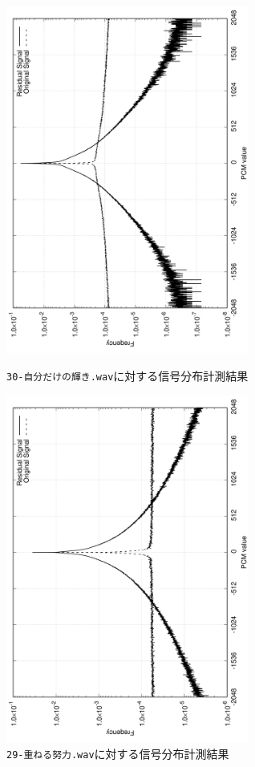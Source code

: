 \documentclass[uplatex,dvipdfmx,b5j,10pt]{jsbook}
\theoremstyle{definition}
\begin{document}
\begin{figure}[htbp]
  \begin{center}
    \includegraphics[width=80mm,angle=-90]{./figs/jibundakenokagayaki_dist.png}
    \caption{\texttt{30-自分だけの輝き.wav}に対する信号分布計測結果} \label{jibundakenokagayaki_dist}
  \end{center}
  \begin{center}
    \includegraphics[width=80mm,angle=-90]{./figs/kasanerudoryoku_dist.png}
    \caption{\texttt{29-重ねる努力.wav}に対する信号分布計測結果} \label{kasanerudoryoku_dist}
  \end{center}
\end{figure}
\end{document}
